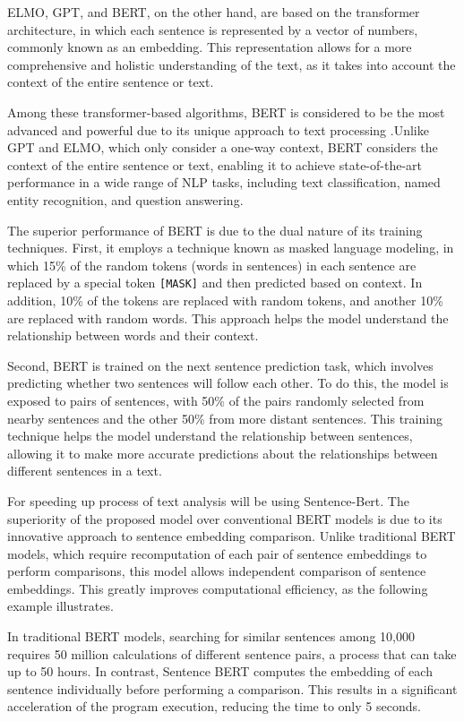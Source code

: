 \documentclass[PI]{ProjectProposal}
\begin{document}
ELMO, GPT, and BERT, on the other hand, are based on the transformer architecture, in which each sentence is represented by a vector of numbers, commonly known as an embedding. This representation allows for a more comprehensive and holistic understanding of the text, as it takes into account the context of the entire sentence or text.

Among these transformer-based algorithms, BERT is considered to be the most advanced and powerful due to its unique approach to text processing \autocite{devlin2018bert}.Unlike GPT and ELMO, which only consider a one-way context, BERT considers the context of the entire sentence or text, enabling it to achieve state-of-the-art performance in a wide range of NLP tasks, including text classification, named entity recognition, and question answering.

The superior performance of BERT is due to the dual nature of its training techniques. First, it employs a technique known as masked language modeling, in which 15\% of the random tokens (words in sentences) in each sentence are replaced by a special token \texttt{[MASK]} and then predicted based on context. In addition, 10\% of the tokens are replaced with random tokens, and another 10\% are replaced with random words. This approach helps the model understand the relationship between words and their context.

Second, BERT is trained on the next sentence prediction task, which involves predicting whether two sentences will follow each other. To do this, the model is exposed to pairs of sentences, with 50\% of the pairs randomly selected from nearby sentences and the other 50\% from more distant sentences. This training technique helps the model understand the relationship between sentences, allowing it to make more accurate predictions about the relationships between different sentences in a text.

For speeding up process of text analysis will be using Sentence-Bert\autocite{reimers-2019-sentence-bert}. The superiority of the proposed model over conventional BERT models is due to its innovative approach to sentence embedding comparison. Unlike traditional BERT models, which require recomputation of each pair of sentence embeddings to perform comparisons, this model allows independent comparison of sentence embeddings. This greatly improves computational efficiency, as the following example illustrates.

In traditional BERT models, searching for similar sentences among 10,000 requires 50 million calculations of different sentence pairs, a process that can take up to 50 hours. In contrast, Sentence BERT computes the embedding of each sentence individually before performing a comparison. This results in a significant acceleration of the program execution, reducing the time to only 5 seconds.
\end{document}
